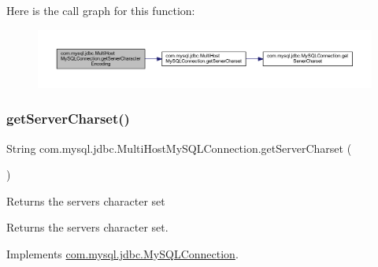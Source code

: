 Here is the call graph for this function\+:
\nopagebreak
\begin{figure}[H]
\begin{center}
\leavevmode
\includegraphics[width=350pt]{classcom_1_1mysql_1_1jdbc_1_1_multi_host_my_s_q_l_connection_a940e7c80b671d477225bb90a97dd0f78_cgraph}
\end{center}
\end{figure}
\mbox{\label{classcom_1_1mysql_1_1jdbc_1_1_multi_host_my_s_q_l_connection_ade6eec72969b91ca518b7750d0af4539}} 
\subsubsection{\texorpdfstring{get\+Server\+Charset()}{getServerCharset()}}
{\footnotesize\ttfamily String com.\+mysql.\+jdbc.\+Multi\+Host\+My\+S\+Q\+L\+Connection.\+get\+Server\+Charset (\begin{DoxyParamCaption}{ }\end{DoxyParamCaption})}

Returns the server\textquotesingle{}s character set

\begin{DoxyReturn}{Returns}
the server\textquotesingle{}s character set. 
\end{DoxyReturn}


Implements \mbox{\hyperlink{interfacecom_1_1mysql_1_1jdbc_1_1_my_s_q_l_connection_a4f921d9cf354764fd1241cd56c0abecb}{com.\+mysql.\+jdbc.\+My\+S\+Q\+L\+Connection}}.

